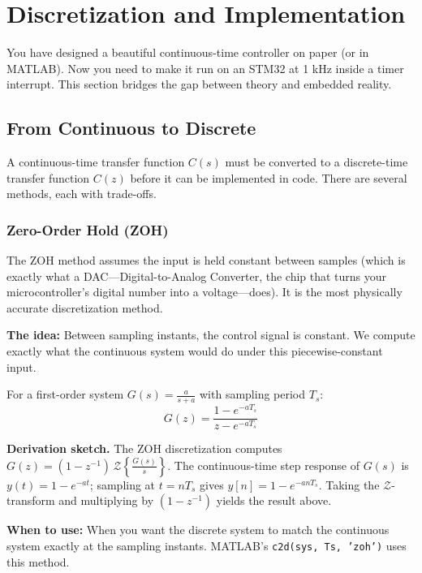 \section{Discretization and Implementation}

You have designed a beautiful continuous-time controller on paper (or in MATLAB). Now you need to make it run on an STM32 at 1 kHz inside a timer interrupt. This section bridges the gap between theory and embedded reality.

\subsection{From Continuous to Discrete}

A continuous-time transfer function $C(s)$ must be converted to a discrete-time transfer function $C(z)$ before it can be implemented in code. There are several methods, each with trade-offs.

\subsubsection{Zero-Order Hold (ZOH)}

The ZOH method assumes the input is held constant between samples (which is exactly what a DAC---Digital-to-Analog Converter, the chip that turns your microcontroller's digital number into a voltage---does). It is the most physically accurate discretization method.

\textbf{The idea:} Between sampling instants, the control signal is constant. We compute exactly what the continuous system would do under this piecewise-constant input.

For a first-order system $G(s) = \frac{a}{s + a}$ with sampling period $T_s$:
\begin{equation}
G(z) = \frac{1 - e^{-aT_s}}{z - e^{-aT_s}}
\end{equation}

\textbf{Derivation sketch.} The ZOH discretization computes $G(z) = (1 - z^{-1})\,\mathcal{Z}\!\left\{\frac{G(s)}{s}\right\}$. The continuous-time step response of $G(s)$ is $y(t) = 1 - e^{-at}$; sampling at $t = nT_s$ gives $y[n] = 1 - e^{-anT_s}$. Taking the $\mathcal{Z}$-transform and multiplying by $(1 - z^{-1})$ yields the result above.

\textbf{When to use:} When you want the discrete system to match the continuous system exactly at the sampling instants. MATLAB's \texttt{c2d(sys, Ts, 'zoh')} uses this method.

